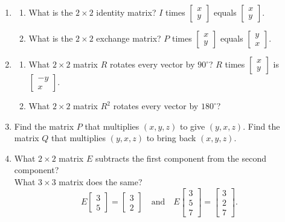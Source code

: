 \documentclass[14pt, a4paper]{article}
\begin{document}
\begin{enumerate}[resume]
    \item
          \begin{enumerate}
              \item[(a)] What is the $2 \times 2$ identity matrix? $I$ times $\begin{bmatrix} x \\ y \end{bmatrix}$ equals $\begin{bmatrix} x \\ y \end{bmatrix}$.
              \item[(b)] What is the $2 \times 2$ exchange matrix? $P$ times $\begin{bmatrix} x \\ y \end{bmatrix}$ equals $\begin{bmatrix} y \\ x \end{bmatrix}$.
          \end{enumerate}

    \item
          \begin{enumerate}
              \item[(a)] What $2 \times 2$ matrix $R$ rotates every vector by $90^\circ$? $R$ times $\begin{bmatrix} x \\ y \end{bmatrix}$ is $\begin{bmatrix} -y \\ x \end{bmatrix}$.
              \item[(b)] What $2 \times 2$ matrix $R^2$ rotates every vector by $180^\circ$?
          \end{enumerate}

    \item Find the matrix $P$ that multiplies $(x, y, z)$ to give $(y, x, z)$. Find the matrix $Q$ that multiplies $(y, x, z)$ to bring back $(x, y, z)$.

    \item What $2 \times 2$ matrix $E$ subtracts the first component from the second component? \\
          What $3 \times 3$ matrix does the same? \\
          \[
              E \begin{bmatrix} 3 \\ 5 \end{bmatrix} = \begin{bmatrix} 3 \\ 2 \end{bmatrix}
              \quad \text{and} \quad
              E \begin{bmatrix} 3 \\ 5 \\ 7 \end{bmatrix} = \begin{bmatrix} 3 \\ 2 \\ 7 \end{bmatrix}.
          \]


\end{enumerate}
\end{document}
